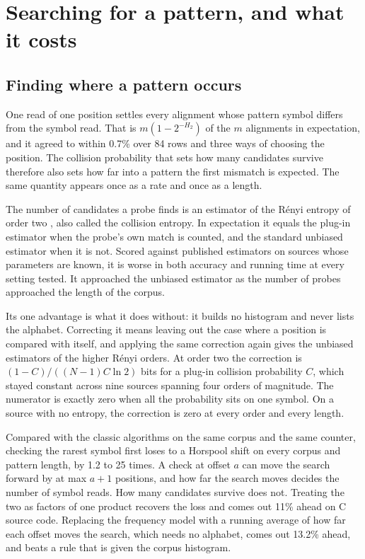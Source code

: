 \chapter{Searching for a pattern, and what it costs}

\section{Finding where a pattern occurs}

One read of one position settles every alignment whose pattern symbol differs from the symbol read. That is \(m(1-2^{-H_2})\) of the \(m\) alignments in expectation, and it agreed to within 0.7\% over 84 rows and three ways of choosing the position. The collision probability that sets how many candidates survive therefore also sets how far into a pattern the first mismatch is expected. The same quantity appears once as a rate and once as a length.

The number of candidates a probe finds is an estimator of the R\'enyi entropy of order two \cite{src:Renyi}, also called the collision entropy. In expectation it equals the plug-in estimator when the probe's own match is counted, and the standard unbiased estimator when it is not. Scored against published estimators on sources whose parameters are known, it is worse in both accuracy and running time at every setting tested. It approached the unbiased estimator as the number of probes approached the length of the corpus.

Its one advantage is what it does without: it builds no histogram and never lists the alphabet. Correcting it means leaving out the case where a position is compared with itself, and applying the same correction again gives the unbiased estimators of the higher R\'enyi orders. At order two the correction is \((1-C)/((N-1)C\ln 2)\) bits for a plug-in collision probability \(C\), which stayed constant across nine sources spanning four orders of magnitude. The numerator is exactly zero when all the probability sits on one symbol. On a source with no entropy, the correction is zero at every order and every length.

Compared with the classic algorithms on the same corpus and the same counter, checking the rarest symbol first loses to a Horspool shift \cite{src:Horspool} on every corpus and pattern length, by 1.2 to 25 times. A check at offset \(a\) can move the search forward by at max \(a+1\) positions, and how far the search moves decides the number of symbol reads. How many candidates survive does not. Treating the two as factors of one product recovers the loss and comes out 11\% ahead on C source code. Replacing the frequency model with a running average of how far each offset moves the search, which needs no alphabet, comes out 13.2\% ahead, and beats a rule that is given the corpus histogram.

